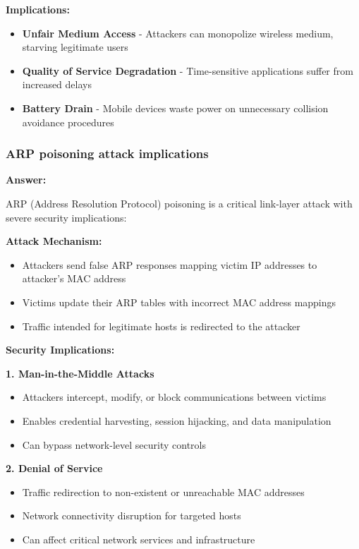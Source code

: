 \documentclass[12pt,a4paper]{article}
\begin{document}
\textbf{Implications:}
\begin{itemize}
    \item \textbf{Unfair Medium Access} - Attackers can monopolize wireless medium, starving legitimate users
    \item \textbf{Quality of Service Degradation} - Time-sensitive applications suffer from increased delays
    \item \textbf{Battery Drain} - Mobile devices waste power on unnecessary collision avoidance procedures
\end{itemize}

\subsubsection{ARP poisoning attack implications}

\textbf{Answer:}

ARP (Address Resolution Protocol) poisoning is a critical link-layer attack with severe security implications:

\textbf{Attack Mechanism:}
\begin{itemize}
    \item Attackers send false ARP responses mapping victim IP addresses to attacker's MAC address
    \item Victims update their ARP tables with incorrect MAC address mappings
    \item Traffic intended for legitimate hosts is redirected to the attacker
\end{itemize}

\textbf{Security Implications:}

\textbf{1. Man-in-the-Middle Attacks}
\begin{itemize}
    \item Attackers intercept, modify, or block communications between victims
    \item Enables credential harvesting, session hijacking, and data manipulation
    \item Can bypass network-level security controls
\end{itemize}

\textbf{2. Denial of Service}
\begin{itemize}
    \item Traffic redirection to non-existent or unreachable MAC addresses
    \item Network connectivity disruption for targeted hosts
    \item Can affect critical network services and infrastructure
\end{itemize}
\end{document}
